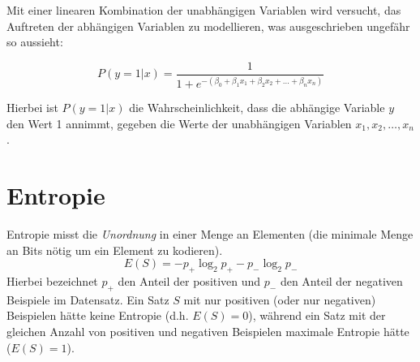 \documentclass[letterpaper, titlepage]{article}
\begin{document}
Mit einer linearen Kombination der unabhängigen Variablen wird versucht, das Auftreten der abhängigen Variablen zu modellieren, was ausgeschrieben ungefähr so aussieht:

\begin{equation}
P(y=1|x) = \frac{1}{1 + e^{-(\beta_0 + \beta_1x_1 + \beta_2x_2 + \ldots + \beta_nx_n)}}
\end{equation}

\vspace*{0.35cm}

Hierbei ist $P(y=1|x)$ die Wahrscheinlichkeit, dass die abhängige Variable $y$ den Wert 1 annimmt, gegeben die Werte der unabhängigen Variablen $x_1, x_2, \ldots, x_n$.

\vspace*{0.35cm}

\section{Entropie}\label{Entropie}
Entropie misst die \textit{Unordnung} in einer Menge an Elementen (die minimale Menge an Bits nötig um ein Element zu kodieren).
\begin{equation}
E(S) = -p_{+}\log_2 p_{+} - p_{-}\log_2p_{-}
\end{equation}
Hierbei bezeichnet $p_{+}$ den Anteil der positiven und $p_{-}$ den Anteil der negativen Beispiele im Datensatz. Ein Satz $S$ mit nur positiven (oder nur negativen) Beispielen hätte keine Entropie (d.h. $E(S)=0$), während ein Satz mit der gleichen Anzahl von positiven und negativen Beispielen maximale Entropie hätte ($E(S)=1$).
\end{document}
